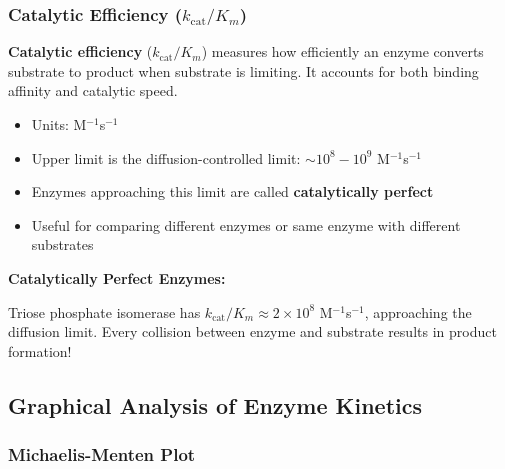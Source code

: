 \subsubsection{Catalytic Efficiency ($k_{\text{cat}}/K_m$)}

\begin{definition}
\textbf{Catalytic efficiency} ($k_{\text{cat}}/K_m$) measures how efficiently an enzyme converts substrate to product when substrate is limiting. It accounts for both binding affinity and catalytic speed.
\end{definition}

\begin{itemize}
    \item Units: M$^{-1}$s$^{-1}$
    \item Upper limit is the diffusion-controlled limit: $\sim 10^8 - 10^9$ M$^{-1}$s$^{-1}$
    \item Enzymes approaching this limit are called \textbf{catalytically perfect}
    \item Useful for comparing different enzymes or same enzyme with different substrates
\end{itemize}

\begin{example}
\textbf{Catalytically Perfect Enzymes:}

Triose phosphate isomerase has $k_{\text{cat}}/K_m \approx 2 \times 10^8$ M$^{-1}$s$^{-1}$, approaching the diffusion limit. Every collision between enzyme and substrate results in product formation!
\end{example}

\subsection{Graphical Analysis of Enzyme Kinetics}

\subsubsection{Michaelis-Menten Plot}

\begin{center}
\end{center}

